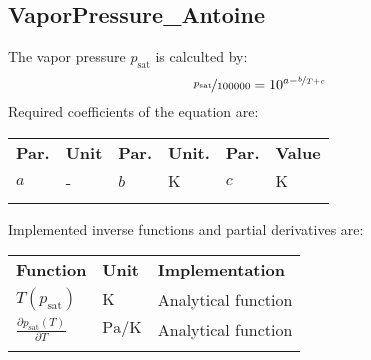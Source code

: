 \subsection{VaporPressure\_Antoine}
\label{cha:approaches:refp:antoine}
%
The vapor pressure $p_\mathrm{sat}$ is calculted by:
%
\begin{equation*}
	\nicefrac{p_\mathrm{sat}}{100000} = 10^{a - \nicefrac{b}{T + c}}
\end{equation*}
%
Required coefficients of the equation are:
%
\begin{longtable}[l]{ll|ll|ll}
\toprule
\addlinespace
\textbf{Par.} & \textbf{Unit} & \textbf{Par.} &	\textbf{Unit.} & \textbf{Par.} & \textbf{Value} \\
\addlinespace
\midrule
\endhead

\bottomrule
\endfoot
\bottomrule
\endlastfoot
\addlinespace

$a$ & - & $b$ & $\si{\kelvin}$ & $c$ & $\si{\kelvin}$ \\	


\addlinespace
\end{longtable}
%
Implemented inverse functions and partial derivatives are:
%
\begin{longtable}[l]{l|l|l}
	\toprule
	\addlinespace
	\textbf{Function} & \textbf{Unit} &	\textbf{Implementation} \\
	\addlinespace
	\midrule
	\endhead
	
	\bottomrule
	\endfoot
	\bottomrule
	\endlastfoot
	\addlinespace
	
	$T(p_\mathrm{sat})$	& $\si{\kelvin}$ & Analytical function \\
	$\frac{\partial p_\mathrm{sat}(T)}{\partial T}$	& $\si{\pascal\per\kelvin}$ & Analytical function\\
	
	\addlinespace
\end{longtable}
%
